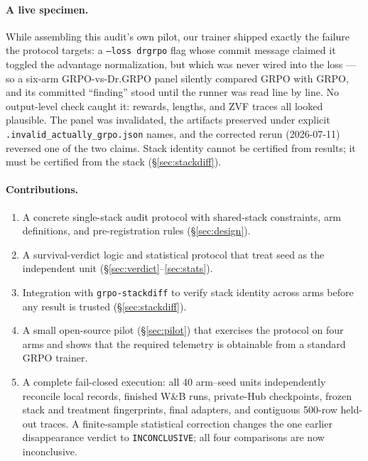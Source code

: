 \documentclass[11pt]{article}
\begin{document}
\paragraph{A live specimen.} While assembling this audit's own pilot, our
trainer shipped exactly the failure the protocol targets: a
\texttt{--loss drgrpo} flag whose commit message claimed it toggled the
advantage normalization, but which was never wired into the loss --- so a
six-arm GRPO-vs-Dr.GRPO panel silently compared GRPO with GRPO, and its
committed ``finding'' stood until the runner was read line by line. No
output-level check caught it: rewards, lengths, and ZVF traces all looked
plausible. The panel was invalidated, the artifacts preserved under
explicit \texttt{.invalid\_actually\_grpo.json} names, and the corrected
rerun (2026-07-11) reversed one of the two claims. Stack identity cannot
be certified from results; it must be certified from the stack
(\S\ref{sec:stackdiff}).

\paragraph{Contributions.}
\begin{enumerate}[leftmargin=1.6em, itemsep=2pt]
  \item A concrete single-stack audit protocol with shared-stack constraints,
    arm definitions, and pre-registration rules (\S\ref{sec:design}).
  \item A survival-verdict logic and statistical protocol that treat seed as
    the independent unit (\S\ref{sec:verdict}--\ref{sec:stats}).
  \item Integration with \texttt{grpo-stackdiff} to verify stack identity
    across arms before any result is trusted (\S\ref{sec:stackdiff}).
  \item A small open-source pilot (\S\ref{sec:pilot}) that exercises the
    protocol on four arms and shows that the required telemetry is obtainable
    from a standard GRPO trainer.
  \item A complete fail-closed execution: all 40 arm--seed units independently
    reconcile local records, finished W\&B runs, private-Hub checkpoints,
    frozen stack and treatment fingerprints, final adapters, and contiguous
    500-row held-out traces. A finite-sample statistical correction changes the
    one earlier disappearance verdict to \texttt{INCONCLUSIVE}; all four
    comparisons are now inconclusive.
\end{enumerate}
\end{document}
